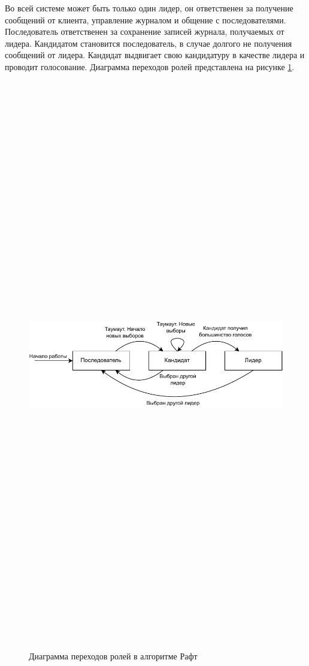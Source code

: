                 Во всей системе может быть только один лидер, он ответственен за получение сообщений от клиента, управление журналом и общение с последователями. Последователь ответственен за сохранение записей журнала, получаемых от лидера. Кандидатом становится последователь, в случае долгого не получения сообщений от лидера. Кандидат выдвигает свою кандидатуру в качестве лидера и проводит голосование. Диаграмма переходов ролей представлена на рисунке \ref{fig:raft}.
                
                \begin{figure}
                    \centering
                    \includegraphics[width=\textwidth,height=25cm,keepaspectratio]{inc/img/raft.pdf}
                    \caption{Диаграмма переходов ролей в алгоритме Рафт} \label{fig:raft}
                \end{figure}

